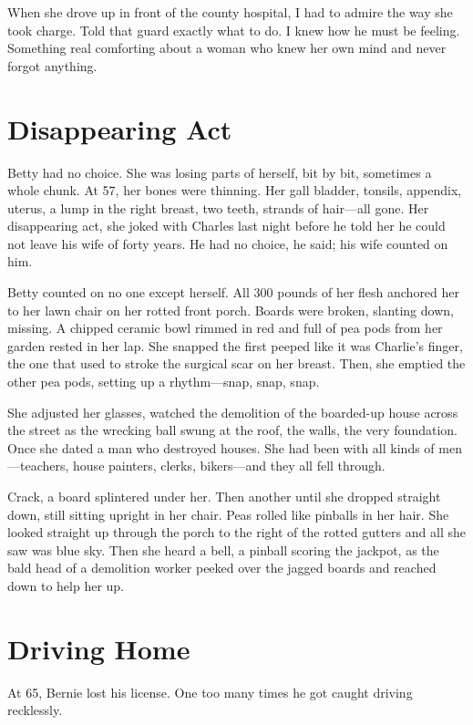 \documentclass[twoside,10pt]{book}
\begin{document}
When she drove up in front of the county hospital, I had to admire the
way she took charge. Told that guard exactly what to do. I knew how he
must be feeling. Something real comforting about a woman who knew her
own mind and never forgot anything.



\cleardoublepage
\chapter{Disappearing Act}

Betty had no choice. She was losing parts of herself, bit by bit,
sometimes a whole chunk. At 57, her bones were thinning. Her gall
bladder, tonsils, appendix, uterus, a lump in the right breast, two
teeth, strands of hair---all gone. Her disappearing act, she joked with
Charles last night before he told her he could not leave his wife of
forty years. He had no choice, he said; his wife counted on him.

Betty counted on no one except herself. All 300 pounds of her flesh
anchored her to her lawn chair on her rotted front porch. Boards were
broken, slanting down, missing. A chipped ceramic bowl rimmed in red and
full of pea pods from her garden rested in her lap. She snapped the first
peeped like it was Charlie's finger, the one that used to stroke the
surgical scar on her breast. Then, she emptied the other pea pods,
setting up a rhythm---snap, snap, snap.

She adjusted her glasses, watched the demolition of the boarded-up house
across the street as the wrecking ball swung at the roof, the walls, the
very foundation. Once she dated a man who destroyed houses. She had been
with all kinds of men---teachers, house painters, clerks, bikers---and
they all fell through.

Crack, a board splintered under her. Then another until she dropped
straight down, still sitting upright in her chair. Peas rolled like
pinballs in her hair. She looked straight up through the porch to the
right of the rotted gutters and all she saw was blue sky. Then she heard
a bell, a pinball scoring the jackpot, as the bald head of a demolition
worker peeked over the jagged boards and reached down to help her
up.


\cleardoublepage
\chapter{Driving Home}

At 65, Bernie lost his license. One too many times he got caught driving
recklessly.
\end{document}
